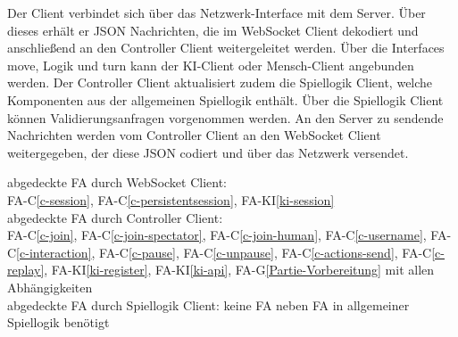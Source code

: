 Der Client verbindet sich über das Netzwerk-Interface mit dem Server. Über dieses erhält er JSON Nachrichten, die im WebSocket Client dekodiert und anschließend an den Controller Client weitergeleitet werden. Über die Interfaces move, Logik und turn kann der KI-Client oder Mensch-Client angebunden werden. Der Controller Client aktualisiert zudem die Spiellogik Client, welche Komponenten aus der allgemeinen Spiellogik enthält. Über die Spiellogik Client können Validierungsanfragen vorgenommen werden. An den Server zu sendende Nachrichten werden vom Controller Client an den WebSocket Client weitergegeben, der diese JSON codiert und über das Netzwerk versendet.\\ 
\newline
abgedeckte FA durch WebSocket Client:\\
FA-C\ref{c-session}, FA-C\ref{c-persistentsession}, FA-KI\ref{ki-session}\\
abgedeckte FA durch Controller Client:\\
FA-C\ref{c-join}, FA-C\ref{c-join-spectator}, FA-C\ref{c-join-human}, FA-C\ref{c-username}, FA-C\ref{c-interaction}, FA-C\ref{c-pause}, FA-C\ref{c-unpause}, FA-C\ref{c-actions-send}, FA-C\ref{c-replay}, FA-KI\ref{ki-register}, FA-KI\ref{ki-api}, FA-G\ref{Partie-Vorbereitung} mit allen Abhängigkeiten\\
abgedeckte FA durch Spiellogik Client: keine FA neben FA in allgemeiner Spiellogik benötigt\\



